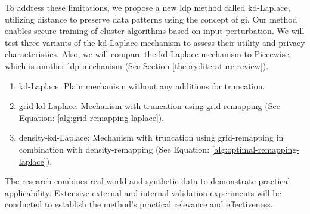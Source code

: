 To address these limitations, we propose a new \gls{ldp} method called kd-Laplace, utilizing distance to preserve data patterns using the concept of \gls{gi}. \newline
Our method enables secure training of cluster algorithms based on input-perturbation.
We will test three variants of the kd-Laplace mechanism to assess their utility and privacy characteristics.
Also, we will compare the kd-Laplace mechanism to Piecewise, which is another \gls{ldp} mechanism (See Section \ref{theory:literature-review}).
\begin{enumerate}
  \item kd-Laplace: Plain mechanism without any additions for truncation.
  \item grid-kd-Laplace: Mechanism with truncation using grid-remapping (See Equation: \ref{alg:grid-remapping-laplace}).
  \item density-kd-Laplace: Mechanism with truncation using grid-remapping in combination with density-remapping (See Equation: \ref{alg:optimal-remapping-laplace}).
\end{enumerate}

The research combines real-world and synthetic data to demonstrate practical applicability.
Extensive external and internal validation experiments will be conducted to establish the method's practical relevance and effectiveness.


